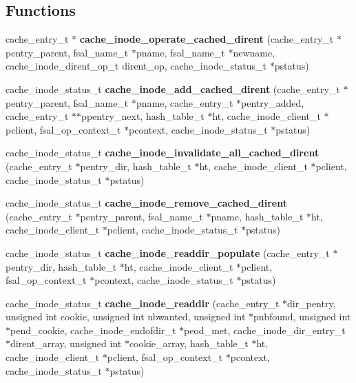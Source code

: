 \subsection*{Functions}
\begin{CompactItemize}
\item 
cache\_\-entry\_\-t $\ast$ {\bf cache\_\-inode\_\-operate\_\-cached\_\-dirent} (cache\_\-entry\_\-t $\ast$pentry\_\-parent, fsal\_\-name\_\-t $\ast$pname, fsal\_\-name\_\-t $\ast$newname, cache\_\-inode\_\-dirent\_\-op\_\-t dirent\_\-op, cache\_\-inode\_\-status\_\-t $\ast$pstatus)
\item 
cache\_\-inode\_\-status\_\-t {\bf cache\_\-inode\_\-add\_\-cached\_\-dirent} (cache\_\-entry\_\-t $\ast$pentry\_\-parent, fsal\_\-name\_\-t $\ast$pname, cache\_\-entry\_\-t $\ast$pentry\_\-added, cache\_\-entry\_\-t $\ast$$\ast$ppentry\_\-next, hash\_\-table\_\-t $\ast$ht, cache\_\-inode\_\-client\_\-t $\ast$pclient, fsal\_\-op\_\-context\_\-t $\ast$pcontext, cache\_\-inode\_\-status\_\-t $\ast$pstatus)
\item 
cache\_\-inode\_\-status\_\-t {\bf cache\_\-inode\_\-invalidate\_\-all\_\-cached\_\-dirent} (cache\_\-entry\_\-t $\ast$pentry\_\-dir, hash\_\-table\_\-t $\ast$ht, cache\_\-inode\_\-client\_\-t $\ast$pclient, cache\_\-inode\_\-status\_\-t $\ast$pstatus)
\item 
cache\_\-inode\_\-status\_\-t {\bf cache\_\-inode\_\-remove\_\-cached\_\-dirent} (cache\_\-entry\_\-t $\ast$pentry\_\-parent, fsal\_\-name\_\-t $\ast$pname, hash\_\-table\_\-t $\ast$ht, cache\_\-inode\_\-client\_\-t $\ast$pclient, cache\_\-inode\_\-status\_\-t $\ast$pstatus)
\item 
cache\_\-inode\_\-status\_\-t {\bf cache\_\-inode\_\-readdir\_\-populate} (cache\_\-entry\_\-t $\ast$pentry\_\-dir, hash\_\-table\_\-t $\ast$ht, cache\_\-inode\_\-client\_\-t $\ast$pclient, fsal\_\-op\_\-context\_\-t $\ast$pcontext, cache\_\-inode\_\-status\_\-t $\ast$pstatus)
\item 
cache\_\-inode\_\-status\_\-t {\bf cache\_\-inode\_\-readdir} (cache\_\-entry\_\-t $\ast$dir\_\-pentry, unsigned int cookie, unsigned int nbwanted, unsigned int $\ast$pnbfound, unsigned int $\ast$pend\_\-cookie, cache\_\-inode\_\-endofdir\_\-t $\ast$peod\_\-met, cache\_\-inode\_\-dir\_\-entry\_\-t $\ast$dirent\_\-array, unsigned int $\ast$cookie\_\-array, hash\_\-table\_\-t $\ast$ht, cache\_\-inode\_\-client\_\-t $\ast$pclient, fsal\_\-op\_\-context\_\-t $\ast$pcontext, cache\_\-inode\_\-status\_\-t $\ast$pstatus)
\end{CompactItemize}


